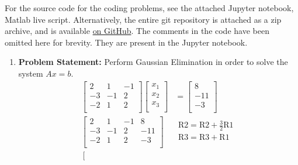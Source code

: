 \documentclass[12pt,twoside]{amsart}
\begin{document}
\thispagestyle{fancy}
\pagestyle{fancy}
\fancyhf{}

For the source code for the coding problems, see the attached Jupyter notebook, Matlab live script. Alternatively, the entire git repository  is attached as a zip archive, and is available \href{https://github.com/blackHat-Magic/math-131-HW7}{on GitHub}. The comments in the code have been omitted here for brevity. They are present in the Jupyter notebook.

\begin{enumerate}
    \item \textbf{Problem Statement:} Perform Gaussian Elimination in order to solve the system $Ax = b$.
    \begin{align*}
        \left[\begin{array}{ccc}
            2 & 1 & -1 \\
            -3 & -1 & 2 \\
            -2 & 1 & 2 \\
        \end{array}\right]\left[\begin{array}{c}
            x_1 \\
            x_2 \\
            x_3 \\
        \end{array}\right] & = \left[\begin{array}{c}
            8 \\
            -11 \\
            -3 \\
        \end{array}\right] \\
        \left[\begin{array}{ccc|c}
            2 & 1 & -1 & 8 \\
            -3 & -1 & 2 & -11 \\
            -2 & 1 & 2 & -3 \\
        \end{array}\right] & \begin{array}{c}
            \text{R2} = \text{R2} + \frac{3}{2}\text{R1} \\
            \text{R3} = \text{R3} + \text{R1} \\
        \end{array} \\
        \left[\begin{array}{ccc|c}

\end{array}
\end{align*}
\end{enumerate}
\end{document}
